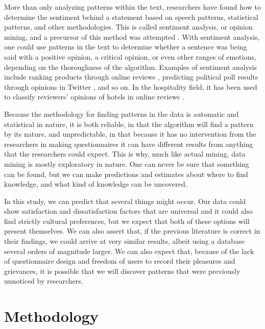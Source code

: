 More than only analyzing patterns within the text, researchers have found how to determine the sentiment behind a statement based on speech patterns, statistical patterns, and other methodologies. This is called sentiment analysis, or opinion mining, and a precursor of this method was attempted \DIFdelbegin {}\DIFdelend \DIFaddbegin {}\DIFaddend \cite[][]{stone1966general}. With sentiment analysis, one could use patterns in the text to determine whether a sentence was being said with a positive opinion, a critical opinion, or even other ranges of emotions, depending on the thoroughness of the algorithm. Examples of sentiment analysis include ranking products through online reviews \cite[e.g][]{liu2017149, zhang2011}, predicting political poll results through opinions in Twitter \cite[][]{oconnor2010}, and so on. In the hospitality field, it has been used to classify reviewers' opinions of hotels in online reviews \cite[e.g.]{kim2017362, alsmadi2018}. 

Because the methodology for finding patterns in the data is automatic and statistical in nature, it is both reliable, in that the algorithm will find a pattern by its nature, and unpredictable, in that because it has no intervention from the researchers in making questionnaires it can have different results from anything that the researchers could expect. This is why, much like actual mining, data mining is mostly exploratory in nature. One can never be sure that something can be found, but we can make predictions and estimates about where to find knowledge, and what kind of knowledge can be uncovered. 

In this study, we can predict that several things might occur. Our data could show satisfaction and dissatisfaction factors that are universal and it could also find strictly cultural preferences, but we expect that both of these options will present themselves. We can also assert that, if the previous literature is correct in their findings, we could arrive at very similar results, albeit using a database several orders of magnitude larger. We can also expect that, because of the lack of questionnaire design and freedom of users to record their pleasures and grievances, it is possible that we will discover patterns that were previously unnoticed by researchers.

\section{Methodology}\label{method}

